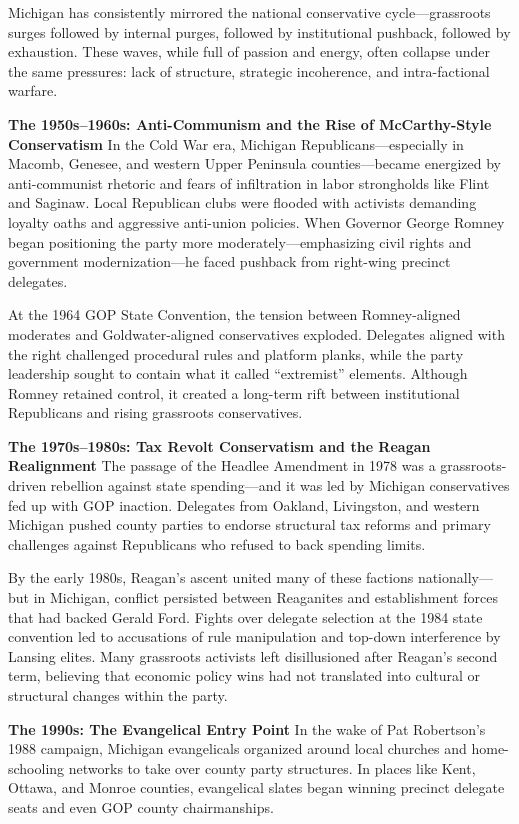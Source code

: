 Michigan has consistently mirrored the national conservative cycle—grassroots surges followed by internal purges, followed by institutional pushback, followed by exhaustion. These waves, while full of passion and energy, often collapse under the same pressures: lack of structure, strategic incoherence, and intra-factional warfare.

\textbf{The 1950s–1960s: Anti-Communism and the Rise of McCarthy-Style Conservatism}
In the Cold War era, Michigan Republicans—especially in Macomb, Genesee, and western Upper Peninsula counties—became energized by anti-communist rhetoric and fears of infiltration in labor strongholds like Flint and Saginaw. Local Republican clubs were flooded with activists demanding loyalty oaths and aggressive anti-union policies. When Governor George Romney began positioning the party more moderately—emphasizing civil rights and government modernization—he faced pushback from right-wing precinct delegates.

At the 1964 GOP State Convention, the tension between Romney-aligned moderates and Goldwater-aligned conservatives exploded. Delegates aligned with the right challenged procedural rules and platform planks, while the party leadership sought to contain what it called “extremist” elements. Although Romney retained control, it created a long-term rift between institutional Republicans and rising grassroots conservatives.

\textbf{The 1970s–1980s: Tax Revolt Conservatism and the Reagan Realignment}
The passage of the Headlee Amendment in 1978 was a grassroots-driven rebellion against state spending—and it was led by Michigan conservatives fed up with GOP inaction. Delegates from Oakland, Livingston, and western Michigan pushed county parties to endorse structural tax reforms and primary challenges against Republicans who refused to back spending limits.

By the early 1980s, Reagan’s ascent united many of these factions nationally—but in Michigan, conflict persisted between Reaganites and establishment forces that had backed Gerald Ford. Fights over delegate selection at the 1984 state convention led to accusations of rule manipulation and top-down interference by Lansing elites. Many grassroots activists left disillusioned after Reagan’s second term, believing that economic policy wins had not translated into cultural or structural changes within the party.

\textbf{The 1990s: The Evangelical Entry Point}
In the wake of Pat Robertson’s 1988 campaign, Michigan evangelicals organized around local churches and home-schooling networks to take over county party structures. In places like Kent, Ottawa, and Monroe counties, evangelical slates began winning precinct delegate seats and even GOP county chairmanships.

